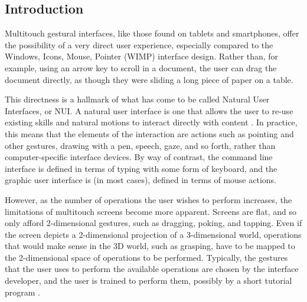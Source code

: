 %
%

\subsection{Introduction}

Multitouch gestural interfaces, like those found on tablets and smartphones, offer the possibility of a very direct user experience, especially compared to the Windows, Icons, Mouse, Pointer (WIMP) interface design. 
Rather than, for example, using an arrow key to scroll in a document, the user can drag the document directly, as though they were sliding a long piece of paper on a table. 

This directness is a hallmark of what has come to be called Natural User Interfaces, or NUI. 
A natural user interface is one that allows the user to re-use existing skills and natural motions to interact directly with content \citep{blakeNUIWin}. 
In practice, this means that the elements of the interaction are actions such as pointing and other gestures, drawing with a pen, speech, gaze, and so forth, rather than computer-specific interface devices. 
By way of contrast, the command line interface is defined in terms of typing with some form of keyboard, and the graphic user interface is (in most cases), defined in terms of mouse actions. 

However, as the number of operations the user wishes to perform increases, the limitations of multitouch screens become more apparent. 
Screens are flat, and so only afford 2-dimensional gestures, such as dragging, poking, and tapping. 
Even if the screen depicts a 2-dimensional projection of a 3-dimensional world, operations that would make sense in the 3D world, such as grasping, have to be mapped to the 2-dimensional space of operations to be performed. 
Typically, the gestures that the user uses to perform the available operations are chosen by the interface developer, and the user is trained to perform them, possibly by a short tutorial program \citep{wobbrock2009user, vanacken2008ghosts, freeman2009shadowguides}. 

